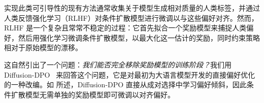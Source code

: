 实现此类可引导性的现有方法通常收集关于模型生成相对质量的人类标签，并通过人类反馈强化学习（RLHF）对条件扩散模型进行微调以与这些偏好对齐。然而，RLHF 是一个复杂且常常不稳定的过程：它首先拟合一个奖励模型来捕捉人类偏好，然后用强化学习微调条件扩散模型，以最大化这一估计的奖励，同时约束策略相对于原始模型的漂移。

这自然引出了一个问题：\emph{我们能否完全移除奖励模型的训练阶段？}我们用 Diffusion-DPO~\citep{wallace2024diffusion} 来回答这个问题，它是对最初为大语言模型开发的直接偏好优化~\citep{rafailov2023direct} 的一种改编。如  所述，Diffusion-DPO 直接从成对选择中学习偏好倾斜，因此条件扩散模型无需单独的奖励模型即可微调以对齐偏好。






